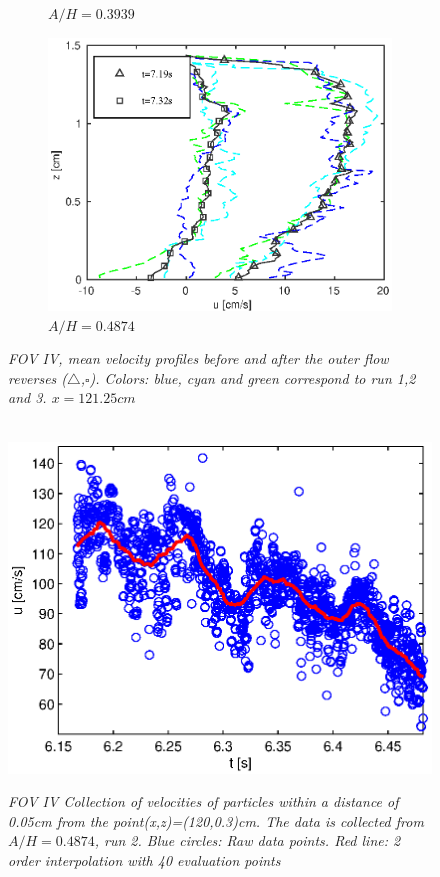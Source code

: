 \documentclass[review]{elsarticle}
\begin{document}
\begin{figure}[]
{\begin{subfigure}[b]{.3\textwidth}
\caption{\textit{$A/H=0.3939$}}
\end{subfigure}%
\begin{subfigure}[b]{.3\textwidth}
\centering
\includegraphics[width=.95\textwidth]{./Figures/FOV_6/PIV_FOV6_case50.eps}
\caption{\textit{$A/H=0.4874$}}
\end{subfigure}%
}
\caption{\textit{FOV IV, mean velocity profiles before and after the outer flow reverses ($\triangle$,$\square$). Colors: blue, cyan and green correspond to run 1,2 and 3. 
$x=121.25cm$} }
\label{fig:PIV_FOV6}
\end{figure}
\begin{figure}[]
        \centering
        ~ %
                \includegraphics[scale=0.6]{./Figures/tid_case50_run2.eps}
                \caption{\textit{FOV IV Collection of velocities of particles within a distance of 0.05cm from the point(x,z)=(120,0.3)cm. The data is collected from  $A/H=0.4874$, run 2. Blue circles: Raw data points. Red line: 2 order interpolation with 40 evaluation points}}
                \label{fig:wave_in_time}
        \end{figure}      
\end{document}
